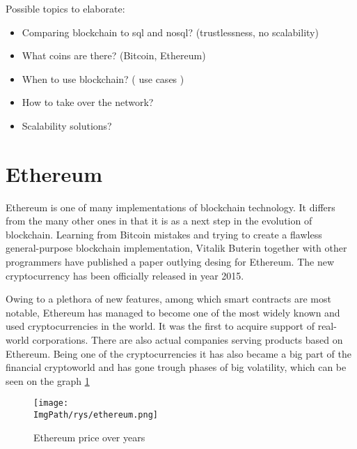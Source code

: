 \documentclass[a4paper,12pt,twoside,openany]{report}
\newcommand{\ImgPath}{.}
\begin{document}
Possible topics to elaborate:
\begin{itemize}
\item Comparing blockchain to sql and nosql? (trustlessness, no scalability)
\item What coins are there? (Bitcoin, Ethereum)
\item When to use blockchain? ( use cases )
\item How to take over the network?
\item Scalability solutions?
\end{itemize}

\section{Ethereum}

Ethereum is one of many implementations of blockchain technology. It differs from the many other ones in that it is as a next step in the evolution of blockchain. Learning from Bitcoin mistakes and trying to create a flawless general-purpose blockchain implementation, Vitalik Buterin together with other programmers have published a paper outlying desing for Ethereum. \cite{Ethereum} The new cryptocurrency has been officially released in year 2015. 

Owing to a plethora of new features, among which smart contracts are most notable, Ethereum has managed to become one of the most widely known and used cryptocurrencies in the world. It was the first to acquire support of real-world corporations. There are also actual companies serving products based on Ethereum. Being one of the cryptocurrencies it has also became a big part of the financial cryptoworld and has gone trough phases of big volatility, which can be seen on the graph \ref{ethereum}

\begin{figure}[!htbp]
	\begin{center}
\centering
\texttt{[image: \\ImgPath/rys/ethereum.png]}
\end{center}
	\caption{Ethereum price over years}
	\label{ethereum}
\end{figure}
\end{document}
